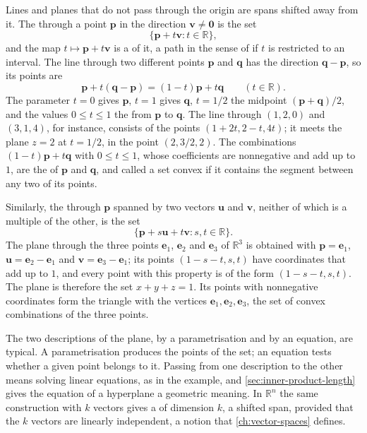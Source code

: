 Lines and planes that do not pass through the origin are spans shifted away from it. The  through a point $\mathbf p$ in the direction $\mathbf v\ne\mathbf 0$ is the set
\[
\{\mathbf p+t\mathbf v: t\in\mathbb R\},
\]
and the map $t\mapsto\mathbf p+t\mathbf v$ is a  of it, a path in the sense of  if $t$ is restricted to an interval. The line through two different points $\mathbf p$ and $\mathbf q$ has the direction $\mathbf q-\mathbf p$, so its points are
\[
\mathbf p+t(\mathbf q-\mathbf p)=(1-t)\mathbf p+t\mathbf q\qquad(t\in\mathbb R).
\]
The parameter $t=0$ gives $\mathbf p$, $t=1$ gives $\mathbf q$, $t=1/2$ the midpoint $(\mathbf p+\mathbf q)/2$, and the values $0\le t\le1$ the  from $\mathbf p$ to $\mathbf q$. The line through $(1,2,0)$ and $(3,1,4)$, for instance, consists of the points $(1+2t,2-t,4t)$; it meets the plane $z=2$ at $t=1/2$, in the point $(2,3/2,2)$. The combinations $(1-t)\mathbf p+t\mathbf q$ with $0\le t\le1$, whose coefficients are nonnegative and add up to $1$, are the  of $\mathbf p$ and $\mathbf q$, and  called a set convex if it contains the segment between any two of its points.

Similarly, the  through $\mathbf p$ spanned by two vectors $\mathbf u$ and $\mathbf v$, neither of which is a multiple of the other, is the set
\[
\{\mathbf p+s\mathbf u+t\mathbf v: s,t\in\mathbb R\}.
\]
The plane through the three points $\mathbf e_1$, $\mathbf e_2$ and $\mathbf e_3$ of $\mathbb R^3$ is obtained with $\mathbf p=\mathbf e_1$, $\mathbf u=\mathbf e_2-\mathbf e_1$ and $\mathbf v=\mathbf e_3-\mathbf e_1$; its points $(1-s-t,s,t)$ have coordinates that add up to $1$, and every point with this property is of the form $(1-s-t,s,t)$. The plane is therefore the set $x+y+z=1$. Its points with nonnegative coordinates form the triangle with the vertices $\mathbf e_1,\mathbf e_2,\mathbf e_3$, the set of convex combinations of the three points.

The two descriptions of the plane, by a parametrisation and by an equation, are typical. A parametrisation produces the points of the set; an equation tests whether a given point belongs to it. Passing from one description to the other means solving linear equations, as in the example, and \cref{sec:inner-product-length} gives the equation of a hyperplane a geometric meaning. In $\mathbb R^n$ the same construction with $k$ vectors gives a  of dimension $k$, a shifted span, provided that the $k$ vectors are linearly independent, a notion that \cref{ch:vector-spaces} defines.

